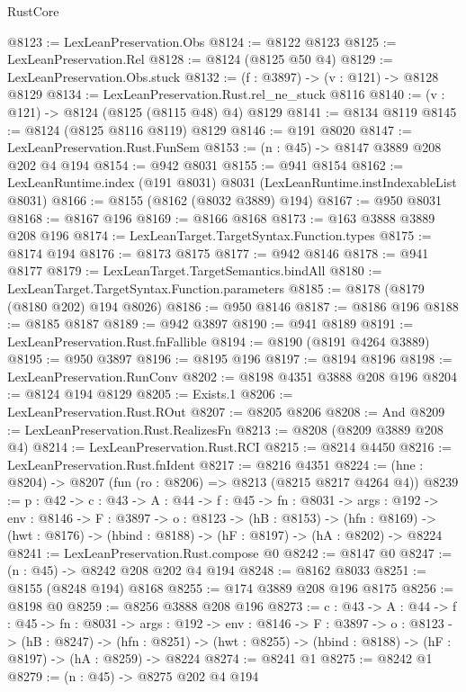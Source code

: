\begin{lexlean}{RustCore}
\begin{coremodule}
@8123 := LexLeanPreservation.Obs
@8124 := @8122 @8123
@8125 := LexLeanPreservation.Rel
@8128 := @8124 (@8125 @50 @4)
@8129 := LexLeanPreservation.Obs.stuck
@8132 := (f : @3897) -> (v : @121) -> @8128 @8129
@8134 := LexLeanPreservation.Rust.rel_ne_stuck @8116
@8140 := (v : @121) -> @8124 (@8125 (@8115 @48) @4) @8129
@8141 := @8134 @8119
@8145 := @8124 (@8125 @8116 @8119) @8129
@8146 := @191 @8020
@8147 := LexLeanPreservation.Rust.FunSem
@8153 := (n : @45) -> @8147 @3889 @208 @202 @4 @194
@8154 := @942 @8031
@8155 := @941 @8154
@8162 := LexLeanRuntime.index (@191 @8031) @8031 (LexLeanRuntime.instIndexableList @8031)
@8166 := @8155 (@8162 (@8032 @3889) @194)
@8167 := @950 @8031
@8168 := @8167 @196
@8169 := @8166 @8168
@8173 := @163 @3888 @3889 @208 @196
@8174 := LexLeanTarget.TargetSyntax.Function.types
@8175 := @8174 @194
@8176 := @8173 @8175
@8177 := @942 @8146
@8178 := @941 @8177
@8179 := LexLeanTarget.TargetSemantics.bindAll
@8180 := LexLeanTarget.TargetSyntax.Function.parameters
@8185 := @8178 (@8179 (@8180 @202) @194 @8026)
@8186 := @950 @8146
@8187 := @8186 @196
@8188 := @8185 @8187
@8189 := @942 @3897
@8190 := @941 @8189
@8191 := LexLeanPreservation.Rust.fnFallible
@8194 := @8190 (@8191 @4264 @3889)
@8195 := @950 @3897
@8196 := @8195 @196
@8197 := @8194 @8196
@8198 := LexLeanPreservation.RunConv
@8202 := @8198 @4351 @3888 @208 @196
@8204 := @8124 @194 @8129
@8205 := Exists.{1}
@8206 := LexLeanPreservation.Rust.ROut
@8207 := @8205 @8206
@8208 := And
@8209 := LexLeanPreservation.Rust.RealizesFn
@8213 := @8208 (@8209 @3889 @208 @4)
@8214 := LexLeanPreservation.Rust.RCI
@8215 := @8214 @4450
@8216 := LexLeanPreservation.Rust.fnIdent
@8217 := @8216 @4351
@8224 := (hne : @8204) -> @8207 (fun (ro : @8206) => @8213 (@8215 @8217 @4264 @4))
@8239 := {p : @42} ->
  {c : @43} ->
  {A : @44} ->
  {f : @45} ->
  {fn : @8031} ->
  {args : @192} ->
  {env : @8146} ->
  {F : @3897} ->
  {o : @8123} ->
  (hB : @8153) ->
  (hfn : @8169) -> (hwt : @8176) -> (hbind : @8188) -> (hF : @8197) -> (hA : @8202) -> @8224
@8241 := LexLeanPreservation.Rust.compose @0
@8242 := @8147 @0
@8247 := (n : @45) -> @8242 @208 @202 @4 @194
@8248 := @8162 @8033
@8251 := @8155 (@8248 @194) @8168
@8255 := @174 @3889 @208 @196 @8175
@8256 := @8198 @0
@8259 := @8256 @3888 @208 @196
@8273 := {c : @43} ->
  {A : @44} ->
  {f : @45} ->
  {fn : @8031} ->
  {args : @192} ->
  {env : @8146} ->
  {F : @3897} ->
  {o : @8123} ->
  (hB : @8247) ->
  (hfn : @8251) -> (hwt : @8255) -> (hbind : @8188) -> (hF : @8197) -> (hA : @8259) -> @8224
@8274 := @8241 @1
@8275 := @8242 @1
@8279 := (n : @45) -> @8275 @202 @4 @194

\end{coremodule}
\end{lexlean}
